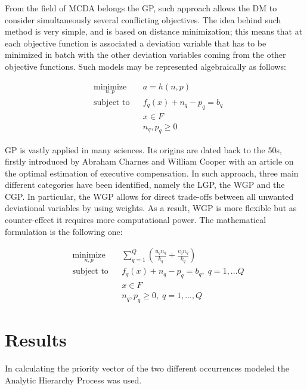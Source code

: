 \documentclass[a0,portrait]{a0poster}
\begin{document}
\begin{multicols}{2}
	From the field of MCDA belongs the GP, such approach allows the DM to consider simultaneously several conflicting objectives. The idea behind such method is very simple, and is based on distance minimization; this means that at each objective function is associated a deviation variable that has to be minimized in batch with the other deviation variables coming from the other objective functions. Such models may be represented algebraically as follows:

\begin{equation*}
\begin{aligned}
& \underset{n,p}{\text{minimize}}
& & a=h(n,p) \\
& \text{subject to}
& & f_q(x)+n_q-p_q=b_q \\
& & & x\in F \\
& & & n_q,p_q\geq 0 
\end{aligned}
\end{equation*}

GP is vastly applied in many sciences\cite{Tamiz1998}. Its origins are dated back to the 50s, firstly introduced by Abraham Charnes and William Cooper\cite{Charnes1955} with an article on the optimal estimation of executive compensation. In such approach, three main different categories have been identified, namely the LGP, the WGP and the CGP.
In particular, the WGP allows for direct trade-offs between all unwanted deviational variables by using weights. As a result, WGP is more flexible but as counter-effect it requires more computational power. The mathematical formulation is the following one:

\begin{equation*}
\begin{aligned}
& \underset{n,p}{\text{minimize}}
& & \sum_{q=1}^{Q}(\frac{u_q n_q}{k_q}+\frac{v_q n_q}{k_q}) \\
& \text{subject to}
& & f_q(x)+n_q-p_q=b_q, \; q=1,...Q \\
& & & x\in F \\
& & & n_q,p_q\geq 0, \; q=1,...,Q 
\end{aligned}
\end{equation*}

\section*{Results}
In calculating the priority vector of the two different occurrences modeled the Analytic Hierarchy Process\cite{Saaty1980} was used.


\end{multicols}
\end{document}
